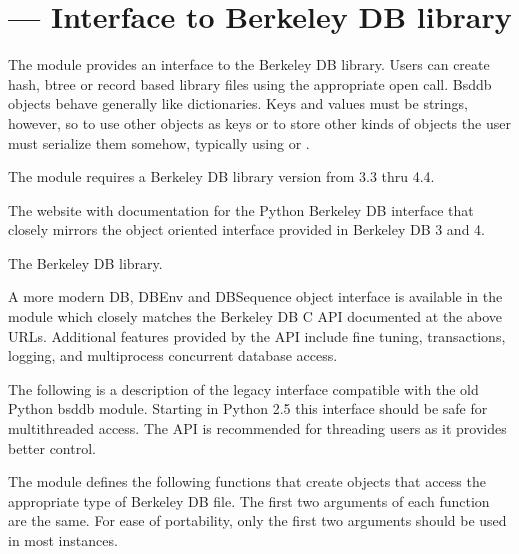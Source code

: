 \section{ ---
         Interface to Berkeley DB library}



The  module provides an interface to the Berkeley DB
library.  Users can create hash, btree or record based library files
using the appropriate open call. Bsddb objects behave generally like
dictionaries.  Keys and values must be strings, however, so to use
other objects as keys or to store other kinds of objects the user must
serialize them somehow, typically using  or 
.

The  module requires a Berkeley DB library version from
3.3 thru 4.4.

\begin{seealso}
         {The website with documentation for the 
          Python Berkeley DB interface that closely mirrors the object
          oriented interface provided in Berkeley DB 3 and 4.}

         {The Berkeley DB library.}
\end{seealso}

A more modern DB, DBEnv and DBSequence object interface is available in the
 module which closely matches the Berkeley DB C API
documented at the above URLs.  Additional features provided by the
 API include fine tuning, transactions, logging, and
multiprocess concurrent database access.

The following is a description of the legacy  interface
compatible with the old Python bsddb module.  Starting in Python 2.5 this
interface should be safe for multithreaded access.  The 
API is recommended for threading users as it provides better control.

The  module defines the following functions that create
objects that access the appropriate type of Berkeley DB file.  The
first two arguments of each function are the same.  For ease of
portability, only the first two arguments should be used in most
instances.

